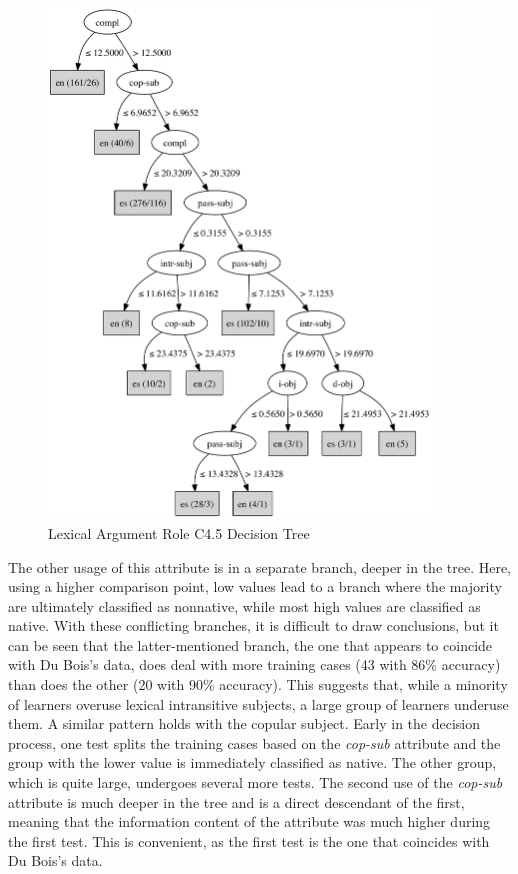 \documentclass[main.tex]{subfiles}
\begin{document}
\begin{figure}[ht]
\centering
\includegraphics[width=4in]{c45-lex-role.pdf}
\caption{Lexical Argument Role C4.5 Decision Tree}
\label{fig:c4.5-lex-role}
\end{figure}
The other usage of this attribute is in a separate branch, deeper in the tree. Here, using a higher comparison point, low values lead to a branch where the majority are ultimately classified as nonnative, while most high values are classified as native. With these conflicting branches, it is difficult to draw conclusions, but it can be seen that the latter-mentioned branch, the one that appears to coincide with Du Bois's data, does deal with more training cases (43 with 86\% accuracy) than does the other (20 with 90\% accuracy). This suggests that, while a minority of learners overuse lexical intransitive subjects, a large group of learners underuse them. A similar pattern holds with the copular subject. Early in the decision process, one test splits the training cases based on the \textit{cop-sub} attribute and the group with the lower value is immediately classified as native. The other group, which is quite large, undergoes several more tests. The second use of the \textit{cop-sub} attribute is much deeper in the tree and is a direct descendant of the first, meaning that the information content of the attribute was much higher during the first test. This is convenient, as the first test is the one that coincides with Du Bois's data. 
\end{document}
